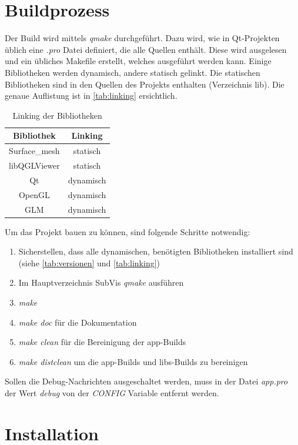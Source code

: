 \section{Buildprozess}

Der Build wird mittels \emph{qmake} durchgeführt.
Dazu wird, wie in Qt-Projekten üblich eine \emph{.pro} Datei definiert, die alle Quellen enthält. 
Diese wird ausgelesen und ein übliches Makefile erstellt, welches ausgeführt werden kann.
Einige Bibliotheken werden dynamisch, andere statisch gelinkt. 
Die statischen Bibliotheken sind in den Quellen des Projekts enthalten (Verzeichnis lib).
Die genaue Auflistung ist in \autoref{tab:linking} ersichtlich.

\begin{table}[h]
\center
\caption{Linking der Bibliotheken}
\label{tab:linking}
\begin{tabular}{c|c}
Bibliothek & Linking\\
\hline
Surface\_mesh & statisch\\
libQGLViewer & statisch\\
Qt & dynamisch\\
OpenGL & dynamisch\\
GLM & dynamisch\\
\end{tabular}
\end{table}

Um das Projekt bauen zu können, sind folgende Schritte notwendig:

\begin{enumerate}
\item Sicherstellen, dass alle dynamischen, benötigten Bibliotheken installiert sind (siehe \autoref{tab:versionen} und \autoref{tab:linking})
\item Im Hauptverzeichnis SubVis \emph{qmake} ausführen
\item \emph{make}
\item \emph{make doc} für die Dokumentation
\item \emph{make clean} für die Bereinigung der app-Builds
\item \emph{make distclean} um die app-Builds und libs-Builds zu bereinigen
\end{enumerate}

Sollen die Debug-Nachrichten ausgeschaltet werden, muss in der Datei \emph{app.pro} der Wert \emph{debug} von der \emph{CONFIG} Variable entfernt werden.

\section{Installation}


